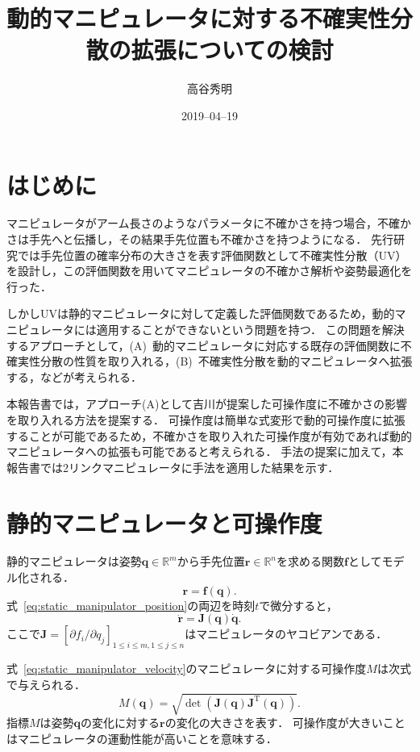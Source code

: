 \documentclass[10pt,a4j,twocolumn]{ltjsarticle}
\title{動的マニピュレータに対する不確実性分散の拡張についての検討} %
\author{高谷秀明}                              %
\date{2019--04--19}                              %
\begin{document}
\maketitle

\section{はじめに}

マニピュレータがアーム長さのようなパラメータに不確かさを持つ場合，不確かさは手先へと伝播し，その結果手先位置も不確かさを持つようになる．
先行研究では手先位置の確率分布の大きさを表す評価関数として不確実性分散（UV）を設計し，この評価関数を用いてマニピュレータの不確かさ解析や姿勢最適化を行った．

しかしUVは静的マニピュレータに対して定義した評価関数であるため，動的マニピュレータには適用することができないという問題を持つ．
この問題を解決するアプローチとして，(A)~動的マニピュレータに対応する既存の評価関数に不確実性分散の性質を取り入れる，(B)~不確実性分散を動的マニピュレータへ拡張する，などが考えられる．

本報告書では，アプローチ(A)として吉川が提案した可操作度に不確かさの影響を取り入れる方法を提案する．
可操作度は簡単な式変形で動的可操作度に拡張することが可能であるため，不確かさを取り入れた可操作度が有効であれば動的マニピュレータへの拡張も可能であると考えられる．
手法の提案に加えて，本報告書では2リンクマニピュレータに手法を適用した結果を示す．

\section{静的マニピュレータと可操作度}

静的マニピュレータは姿勢$\bm{q} \in \mathbb{R}^{m}$から手先位置$\bm{r} \in \mathbb{R}^{n}$を求める関数$\bm{f}$としてモデル化される．
\begin{equation}
  \bm{r} = \bm{f}(\bm{q}). \label{eq:static_manipulator_position}
\end{equation}
式~\eqref{eq:static_manipulator_position}の両辺を時刻$t$で微分すると，
\begin{equation}
  \dot{\bm{r}} = \bm{J}(\bm{q}) \dot{\bm{q}}. \label{eq:static_manipulator_velocity}
\end{equation}
ここで$\bm{J} = [\partial f_{i} / \partial q_{j}]_{1 \leq i \leq m, 1 \leq j \leq n}$はマニピュレータのヤコビアンである．

式~\eqref{eq:static_manipulator_velocity}のマニピュレータに対する可操作度$M$は次式で与えられる．
\begin{equation}
  M(\bm{q}) = \sqrt{\det \left( \bm{J}(\bm{q}) \bm{J}^{\mathrm{T}}(\bm{q}) \right)}.
\end{equation}
指標$M$は姿勢$\bm{q}$の変化に対する$\bm{r}$の変化の大きさを表す．
可操作度が大きいことはマニピュレータの運動性能が高いことを意味する．
\end{document}
